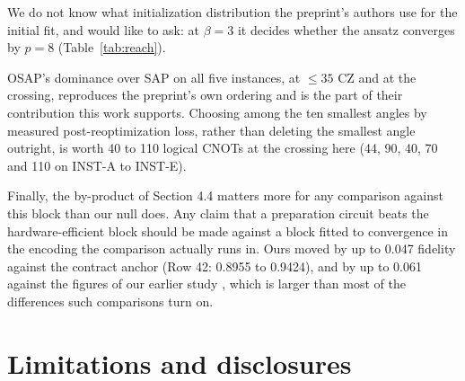 \documentclass[11pt]{article}
\begin{document}
We do not know what initialization distribution the preprint's authors use for the initial fit, and would like to ask: at $\beta = 3$ it decides whether the ansatz converges by $p = 8$ (Table~\ref{tab:reach}).

OSAP's dominance over SAP on all five instances, at $\leq 35$ CZ and at the crossing, reproduces the preprint's own ordering and is the part of their contribution this work supports. Choosing among the ten smallest angles by measured post-reoptimization loss, rather than deleting the smallest angle outright, is worth 40 to 110 logical CNOTs at the crossing here (44, 90, 40, 70 and 110 on INST-A to INST-E).

Finally, the by-product of Section 4.4 matters more for any comparison against this block than our null does. Any claim that a preparation circuit beats the hardware-efficient block should be made against a block fitted to convergence in the encoding the comparison actually runs in. Ours moved by up to 0.047 fidelity against the contract anchor (Row 42: 0.8955 to 0.9424), and by up to 0.061 against the figures of our earlier study \cite{dongo2026instances}, which is larger than most of the differences such comparisons turn on.

\section{Limitations and disclosures}
\end{document}

